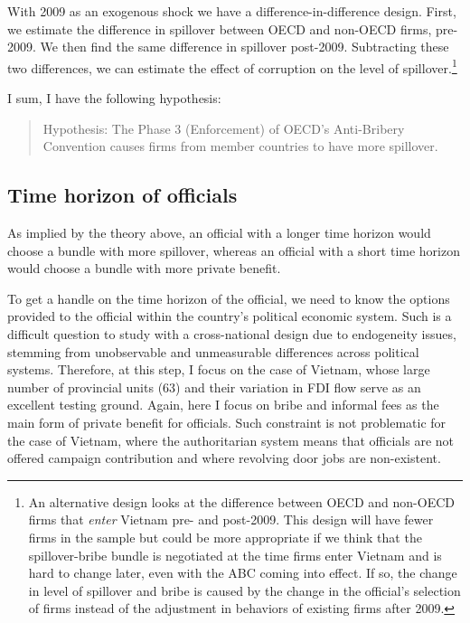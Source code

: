 With 2009 as an exogenous shock we have a difference-in-difference design. First, we estimate the difference in spillover between OECD and non-OECD firms, pre-2009. We then find the same difference in spillover post-2009. Subtracting these two differences, we can estimate the effect of corruption on the level of spillover.\footnote{An alternative design looks at the difference between OECD and non-OECD firms that \textit{enter} Vietnam pre- and post-2009. This design will have fewer firms in the sample but could be more appropriate if we think that the spillover-bribe bundle is negotiated at the time firms enter Vietnam and is hard to change later, even with the ABC coming into effect. If so, the change in level of spillover and bribe is caused by the change in the official's selection of firms instead of the adjustment in behaviors of existing firms after 2009.}

I sum, I have the following hypothesis:

\begin{quote}
Hypothesis: The Phase 3 (Enforcement) of OECD's Anti-Bribery Convention causes firms from member countries to have more spillover.
\end{quote}


\subsection{Time horizon of officials}

As implied by the theory above, an official with a longer time horizon would choose a bundle with more spillover, whereas an official with a short time horizon would choose a bundle with more private benefit.

To get a handle on the time horizon of the official, we need to know the options provided to the official within the country's political economic system. Such is a difficult question to study with a cross-national design due to endogeneity issues, stemming from unobservable and unmeasurable differences across political systems. Therefore, at this step, I focus on the case of Vietnam, whose large number of provincial units (63) and their variation in FDI flow serve as an excellent testing ground. Again, here I focus on bribe and informal fees as the main form of private benefit for officials. Such constraint is not problematic for the case of Vietnam, where the authoritarian system means that officials are not offered campaign contribution and where revolving door jobs are non-existent.

